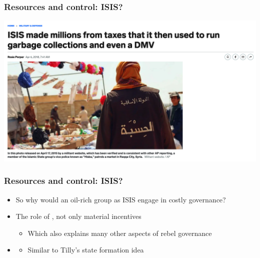 \documentclass[aspectratio=43]{beamer}
\begin{document}
\begin{frame}
\frametitle{Resources and control: ISIS?}
\centering

\includegraphics[width = \textwidth]{img/isis_taxing}

\end{frame}

\begin{frame}
\frametitle{Resources and control: ISIS?}
\centering

\begin{itemize}
  \item So why would an oil-rich group as ISIS engage in costly governance?
  \item<2-> The role of , not only material incentives
  \begin{itemize}
    \item Which also explains many other aspects of rebel governance
  \end{itemize}
  \item<3-> 
  \begin{itemize}
    \item Similar to Tilly's state formation idea
  \end{itemize}
  \end{itemize}

\end{frame}
\end{document}
